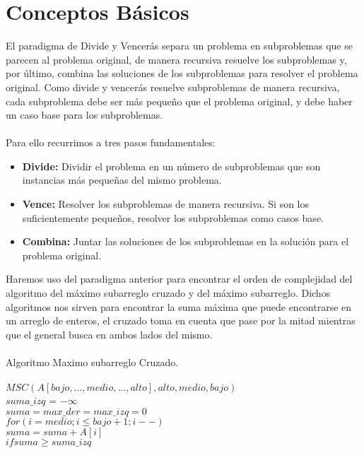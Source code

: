 \documentclass[12pt,twoside]{article}
\begin{document}
\section{Conceptos B\'asicos}
El paradigma de Divide y Vencer\'as separa un problema en subproblemas que se parecen al problema original, de manera recursiva resuelve los subproblemas y, por \'ultimo, combina las soluciones de los subproblemas para resolver el problema original.\newpage
Como divide y vencerás resuelve subproblemas de manera recursiva, cada subproblema debe ser m\'as pequeño que el problema original, y debe haber un caso base para los subproblemas.\\\\
Para ello recurrimos a tres pasos fundamentales:
\begin{itemize}
  \item {\bf Divide:} Dividir el problema en un n\'umero de subproblemas que son instancias m\'as pequeñas del mismo problema.
  \item {\bf Vence:} Resolver los subproblemas de manera recursiva. Si son los suficientemente peque\~{n}os, resolver los subproblemas como casos base.
  \item {\bf Combina:} Juntar las soluciones de los subproblemas en la soluci\'on para el problema original.
\end{itemize}
Haremos uso del paradigma anterior para encontrar el orden de complejidad del algoritmo del m\'aximo subarreglo cruzado y del m\'aximo subarreglo. 
Dichos algoritmos nos sirven para encontrar la suma m\'axima que puede encontrarse en un arreglo de enteros, el cruzado toma en cuenta que pase por la mitad mientras que el general busca en ambos lados del mismo.\\\\
Algoritmo Maximo subarreglo Cruzado.\\\\
\hspace*{1cm}$MSC(A[bajo,...,medio,...,alto],alto,medio,bajo)$\\
\hspace*{2cm}$suma\_izq$ = $-\infty$\\
\hspace*{2cm}$suma = max\_der = max\_izq = 0$\\
\hspace*{2cm}$for(i=medio;i \leq bajo+1;i--)$\\
\hspace*{2.5cm}$suma = suma + A[i]$\\
\hspace*{2.5cm}$if suma \geq suma\_izq$\\
\end{document}
